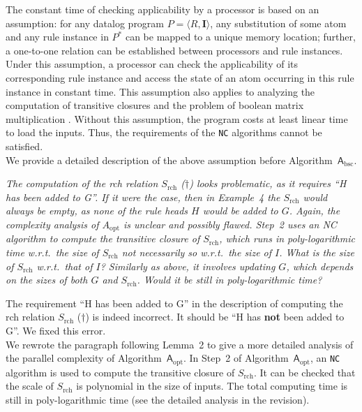 \documentclass{article}
\let\quoteOld\quote
\let\endquoteOld\endquote
\renewenvironment{quote}{\quoteOld\itshape}{\endquoteOld}
\begin{document}
The constant time of checking applicability by a processor is based on an assumption:
for any datalog program $P=\langle R, \textbf{I}\rangle$,
any substitution of some atom and any rule instance in $P^*$ can be mapped to a unique memory
location; further, a one-to-one relation can be established between processors and rule instances.
Under this assumption, a processor can check the applicability of its corresponding
rule instance and access the state of an atom occurring in this rule instance in constant time.
This assumption also applies to analyzing the computation of transitive closures \cite{Allender07} and
the problem of boolean matrix multiplication \cite{Raymond95}. Without this assumption, the program
costs at least linear time to load the inputs. Thus, the requirements of the \texttt{NC} algorithms
cannot be satisfied.\\

We provide a detailed description of the above assumption before Algorithm~$\mathsf{A}_{\text{bsc}}$.


\begin{quote}
The computation of the rch relation $S_{\text{rch}}$ ($\dag$) looks problematic, as it requires ``H has been added to G''. If it were the case, then in Example~4 the $S_{\text{rch}}$ would always be empty, as none of the rule heads $H$ would be added to $G$. Again, the complexity analysis of $A_{\text{opt}}$ is unclear and possibly flawed. Step~2 uses an NC algorithm to compute the transitive closure of $S_{\text{rch}}$, which runs in poly-logarithmic time w.r.t.\ the size of $S_{\text{rch}}$ not necessarily so w.r.t.\ the size of $I$. What is the size of $S_{\text{rch}}$ w.r.t.\ that of $I$? Similarly as above, it involves updating $G$, which depends on the sizes of both $G$ and $S_{\text{rch}}$. Would it be still in poly-logarithmic time?
\end{quote}

The requirement ``H has been added to G'' in the description of computing the rch relation $S_{\text{rch}}$ ($\dag$) is indeed
incorrect. It should be ``H has \textbf{not} been added to G''. We fixed this error.\\

We rewrote the paragraph following Lemma~2 to give a more detailed
analysis of the parallel complexity of Algorithm~$\mathsf{A}_{\text{opt}}$.
In Step~2 of Algorithm~$\mathsf{A}_{\text{opt}}$, an \texttt{NC} algorithm is used to compute
the transitive closure of $S_{\text{rch}}$.
It can be checked that the scale of $S_{\text{rch}}$ is polynomial in the size of inputs.
The total computing time is still in poly-logarithmic time (see the detailed analysis in the revision).
\end{document}
